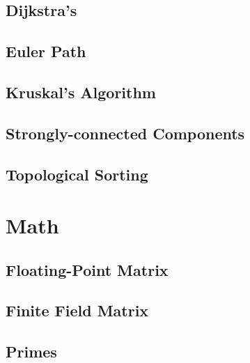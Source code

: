 \subsection{Dijkstra's}
\raggedbottom
\hrulefill
\subsection{Euler Path}
\raggedbottom
\hrulefill
\subsection{Kruskal's Algorithm}
\raggedbottom
\hrulefill
\subsection{Strongly-connected Components}
\raggedbottom
\hrulefill
\subsection{Topological Sorting}
\raggedbottom
\hrulefill

\section{Math}
\subsection{Floating-Point Matrix}
\raggedbottom
\hrulefill
\subsection{Finite Field Matrix}
\raggedbottom
\hrulefill
\subsection{Primes}
\raggedbottom
\hrulefill
